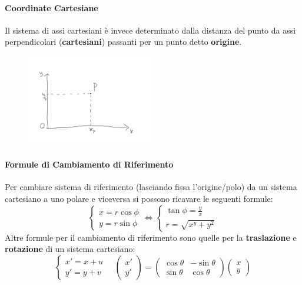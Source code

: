 \documentclass{report}
\begin{document}
\paragraph{Coordinate Cartesiane}
Il sistema di assi cartesiani è invece determinato dalla distanza del punto da assi perpendicolari (\textbf{cartesiani}) passanti per un punto detto \textbf{origine}.
\begin{figure}[H]
    \centering
    \includegraphics[width=0.5\textwidth]{CoordCartesiane.png}
\end{figure}

\paragraph{Formule di Cambiamento di Riferimento}
Per cambiare sistema di riferimento (lasciando fissa l'origine/polo) da un sistema cartesiano a uno polare e viceversa si possono ricavare le seguenti formule:
\begin{equation}
\begin{cases}
x=r\cos\phi\\
y=r\sin\phi
\end{cases}\iff
\begin{cases}
\tan\phi=\frac{y}{x}\\
r=\sqrt{x^y+y^2}
\end{cases}
\end{equation}
Altre formule per il cambiamento di riferimento sono quelle per la \textbf{traslazione} e \textbf{rotazione} di un sistema cartesiano:
\begin{equation}
\begin{cases}
x'=x+u\\
y'=y+v
\end{cases}\quad
\begin{pmatrix}
x'\\y'
\end{pmatrix}=
\begin{pmatrix}
\cos\theta&-\sin\theta\\
\sin\theta&\cos\theta
\end{pmatrix}
\begin{pmatrix}
x\\y
\end{pmatrix}
\end{equation}
\end{document}
